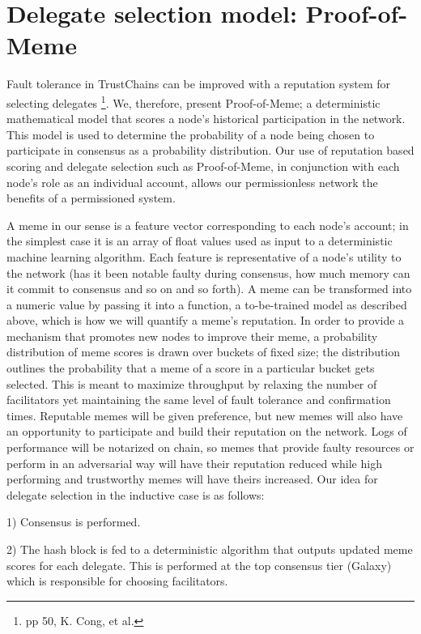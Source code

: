 \documentclass{article}
\begin{document}
\section{Delegate selection model: Proof-of-Meme}
Fault tolerance in TrustChains can be improved with a reputation system for selecting delegates \footnote{pp 50, K. Cong, et al.}. We, therefore, present Proof-of-Meme; a deterministic mathematical model that scores a node's historical participation in the network. This model is used to determine the probability of a node being chosen to participate in consensus as a probability distribution. Our use of reputation based scoring and delegate selection such as Proof-of-Meme, in conjunction with each node's role as an individual account, allows our permissionless network the benefits of a permissioned system.

A meme in our sense is a feature vector corresponding to each node's account; in the simplest case it is an array of float values used as input to a deterministic machine learning algorithm. Each feature is representative of a node's utility to the network (has it been notable faulty during consensus, how much memory can it commit to consensus and so on and so forth). A meme can be transformed into a numeric value by passing it into a function, a to-be-trained model as described above, which is how we will quantify a meme's reputation. In order to provide a mechanism that promotes new nodes to improve their meme, a probability distribution of meme scores is drawn over buckets of fixed size; the distribution outlines the probability that a meme of a score in a particular bucket gets selected. This is meant to maximize throughput by relaxing the number of facilitators yet maintaining the same level of fault tolerance and confirmation times. Reputable memes will be given preference, but new memes will also have an opportunity to participate and build their reputation on the network. Logs of performance will be notarized on chain, so memes that provide faulty resources or perform in an adversarial way will have their reputation reduced while high performing and trustworthy memes will have theirs increased. Our idea for delegate selection in the inductive case is as follows:

1)	Consensus is performed.

2)	The hash block is fed to a deterministic algorithm that outputs updated meme scores for each delegate. This is performed at the top consensus tier (Galaxy) which is responsible for choosing facilitators.
\end{document}
